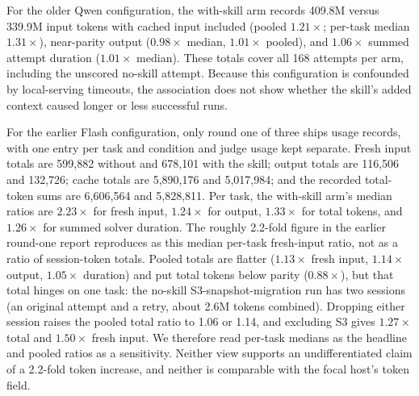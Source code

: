 \documentclass[11pt]{article}
\begin{document}
For the older Qwen configuration, the with-skill arm records 409.8M versus 339.9M input tokens with cached input included (pooled $1.21\times$; per-task median $1.31\times$), near-parity output ($0.98\times$ median, $1.01\times$ pooled), and $1.06\times$ summed attempt duration ($1.01\times$ median). These totals cover all 168 attempts per arm, including the unscored no-skill attempt. Because this configuration is confounded by local-serving timeouts, the association does not show whether the skill's added context caused longer or less successful runs.

For the earlier Flash configuration, only round one of three ships usage records, with one entry per task and condition and judge usage kept separate. Fresh input totals are 599,882 without and 678,101 with the skill; output totals are 116,506 and 132,726; cache totals are 5,890,176 and 5,017,984; and the recorded total-token sums are 6,606,564 and 5,828,811. Per task, the with-skill arm's median ratios are $2.23\times$ for fresh input, $1.24\times$ for output, $1.33\times$ for total tokens, and $1.26\times$ for summed solver duration. The roughly 2.2-fold figure in the earlier round-one report reproduces as this median per-task fresh-input ratio, not as a ratio of session-token totals. Pooled totals are flatter ($1.13\times$ fresh input, $1.14\times$ output, $1.05\times$ duration) and put total tokens below parity ($0.88\times$), but that total hinges on one task: the no-skill S3-snapshot-migration run has two sessions (an original attempt and a retry, about 2.6M tokens combined). Dropping either session raises the pooled total ratio to 1.06 or 1.14, and excluding S3 gives $1.27\times$ total and $1.50\times$ fresh input. We therefore read per-task medians as the headline and pooled ratios as a sensitivity. Neither view supports an undifferentiated claim of a 2.2-fold token increase, and neither is comparable with the focal host's token field.
\end{document}
